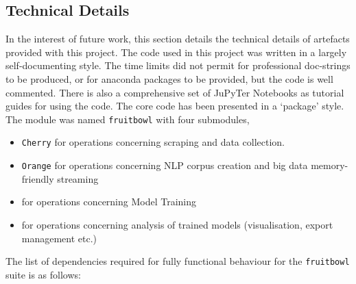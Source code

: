 \subsection{Technical Details}
In the interest of future work, this section details the technical details of artefacts provided with this project. The code used in this project was written in a largely self-documenting style. The time limits did not permit for professional doc-strings to be produced, or for anaconda packages to be provided, but the code is well commented. There is also a comprehensive set of JuPyTer Notebooks as tutorial guides for using the code. The core code has been presented in a `package' style.  The module was named \texttt{fruitbowl} with four submodules,
\begin{itemize}
\item \texttt{Cherry} for operations concerning scraping and data collection.
\item \texttt{Orange} for operations concerning NLP corpus creation and big data memory-friendly streaming
\item {} for operations concerning Model Training
\item {} for operations concerning analysis of trained models (visualisation, export management etc.)
\end{itemize} 
The list of dependencies required for fully functional behaviour for the \texttt{fruitbowl} suite is as follows:
